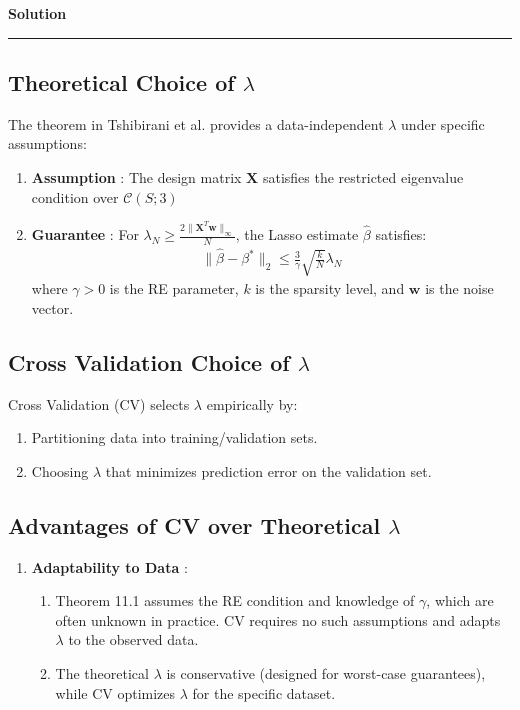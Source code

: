 \documentclass[a4paper,12pt]{article}
\newenvironment{solution}[2][]{%
    \begin{mdframed}[linecolor=blue!70!black, linewidth=2pt, roundcorner=10pt, backgroundcolor=yellow!10!white, skipabove=12pt, skipbelow=12pt]%
        \textbf{\large #2}
        \par\noindent\rule{\textwidth}{0.4pt}
}{
    \end{mdframed}
}
\begin{document}
\begin{solution}{Solution}
  \subsection{Theoretical Choice of $\lambda$}

  The theorem in Tshibirani et al. provides a data-independent $\lambda$ under specific assumptions:
  \begin{enumerate}
    \item \textbf{Assumption} : The design matrix $\mathbf{X}$ satisfies the restricted eigenvalue condition over $\mathcal{C}(S;3)$
    \item \textbf{Guarantee} : For $\lambda_N \geq \frac{2\|\mathbf{X}^T \mathbf{w}\|_\infty}{N}$, the Lasso estimate $\hat{\beta}$ satisfies:
    \begin{align*}
      \|\hat{\beta} - \beta^*\|_2 \leq \frac{3}{\gamma} \sqrt{\frac{k}{N}} \lambda_N
    \end{align*}
    where $\gamma > 0$ is the RE parameter, $k$ is the sparsity level, and $\mathbf{w}$ is the noise vector.
  \end{enumerate} 

  \subsection{Cross Validation Choice of $\lambda$}
  Cross Validation (CV) selects $\lambda$ empirically by:
  \begin{enumerate}
      \item Partitioning data into training/validation sets.
      \item Choosing $\lambda$ that minimizes prediction error on the validation set.
  \end{enumerate}

  \subsection{Advantages of CV over Theoretical $\lambda$}
  \begin{enumerate}
      \item \textbf{Adaptability to Data} :
      \begin{enumerate}
          \item Theorem 11.1 assumes the RE condition and knowledge of $\gamma$, which are often unknown in practice. CV requires no such assumptions and adapts $\lambda$ to the observed data.
          \item The theoretical $\lambda$ is conservative (designed for worst-case guarantees), while CV optimizes $\lambda$ for the specific dataset.
      \end{enumerate}


\end{enumerate}
\end{solution}
\end{document}
